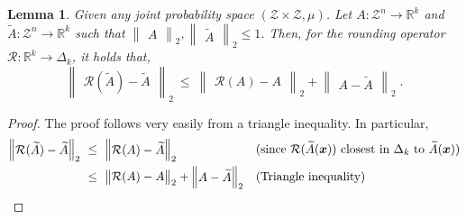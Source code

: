 \documentclass[11pt]{article}
\newcommand{\inabs}[1]{\begin{vmatrix} #1 \end{vmatrix}}
\newcommand{\norm}[2]{\begin{Vmatrix} #2 \end{Vmatrix}_{#1}}
\DeclareMathOperator*{\Ex}{\mathbb{E}}
\newcommand{\wtilde}[1]{\widetilde{#1}}
\newcommand{\eps}{\varepsilon}
\newcommand{\bbR}{{\mathbb R}}
\newcommand{\bx}{{\bm x}}
\newcommand{\calR}{\mathcal{R}}
\newcommand{\calZ}{\mathcal{Z}}
\newtheorem{lem}[theorem]{Lemma}
\begin{document}
\begin{lem}\label{lem:close-to-simplex}
	Given any joint probability space $(\calZ \times \calZ, \mu)$. Let $A : \calZ^n \to \bbR^k$ and $\wtilde{A} : \calZ^n \to \bbR^k$ such that $\norm{2}{A}, \norm{2}{\wtilde{A}} \le 1$. Then, for the rounding operator $\calR : \bbR^k \to \Delta_k$, it holds that,
	\[ \norm{2}{\calR(\wtilde{A}) - \wtilde{A}} ~\le~ \norm{2}{\calR(A) - A} + \norm{2}{A - \wtilde{A}}\;.\]
\end{lem}
\begin{proof}%
	The proof follows very easily from a triangle inequality. In particular,
	\begin{align*}
	\norm{2}{\calR(\wtilde{A}) - \wtilde{A}}
	&~\le~ \norm{2}{\calR(A) - \wtilde{A}} && \text{(since $\calR(\wtilde{A}(\bx))$ closest in $\Delta_k$ to $\wtilde{A}(\bx)$)}\\
	&~\le~ \norm{2}{\calR(A) - A} + \norm{2}{A - \wtilde{A}} && \text{(Triangle inequality)} \qedhere
	\end{align*}
\end{proof}

\end{document}
